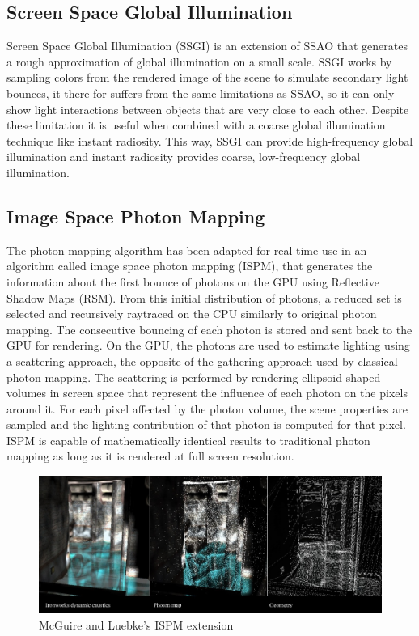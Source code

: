 	\subsection {Screen Space Global Illumination}
        Screen Space Global Illumination (SSGI) is an extension of SSAO that generates a rough approximation of global illumination on a small scale. SSGI works by sampling colors from the rendered image of the scene to simulate secondary light bounces, it there for suffers from the same limitations as SSAO, so it can only show light interactions between objects that are very close to each other. Despite these limitation it is useful when combined with a coarse global illumination technique like instant radiosity. This way, SSGI can provide high-frequency global illumination and instant radiosity provides coarse, low-frequency global illumination.

	\subsection {Image Space Photon Mapping}
		The photon mapping algorithm has been adapted for real-time use in an algorithm called image space photon mapping (ISPM), that generates the information about the first bounce of photons on the GPU using Reflective Shadow Maps (RSM). \cite{dachsbacher2005} 
		From this initial distribution of photons, a reduced set is selected and recursively raytraced on the CPU similarly to original photon mapping. The consecutive bouncing of each photon is stored and sent back to the GPU for rendering. On the GPU, the photons are used to estimate lighting using a scattering approach, the opposite of the gathering approach used by classical photon mapping. The scattering is performed by rendering ellipsoid-shaped volumes in screen space that represent the influence of each photon on the pixels around it. For each pixel affected by the photon volume, the scene properties are sampled and the lighting contribution of that photon is computed for that pixel. ISPM is capable of mathematically identical results to traditional photon mapping as long as it is rendered at full screen resolution.

		\begin{figure}
			\centering
				\includegraphics[width=1.00\textwidth]{Media/ispm.jpg}
			\caption{McGuire and Luebke's ISPM extension}
			\label{fig:ispm}
		\end{figure}
	
